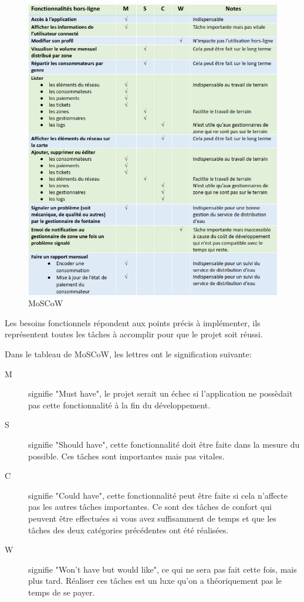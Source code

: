 \documentclass{EPL-master-thesis-covers-FR}
\begin{document}
			\begin{figure}[H]
				\centering
				\includegraphics[width=1\textwidth]{images/moscow}
				\caption{MoSCoW}
			\end{figure}
			
			Les besoins fonctionnels répondent aux points précis à implémenter, ils représentent toutes les tâches à accomplir pour que le projet soit réussi.

			Dans le tableau de MoSCoW, les lettres ont le signification suivante: 
			\begin{description}
				\item[M] signifie "Must have", le projet serait un échec si l'application ne possèdait pas cette fonctionnalité à la fin du développement.
				\item[S] signifie "Should have", cette fonctionnalité doit être faite dans la mesure du possible. Ces tâches sont importantes mais pas vitales.
				\item[C] signifie "Could have", cette fonctionnalité peut être faite si cela n'affecte pas les autres tâches importantes. Ce sont des tâches de confort qui peuvent être effectuées si vous avez suffisamment de temps et que les tâches des deux catégories précédentes ont été réalisées.
				\item[W] signifie "Won't have but would like", ce qui ne sera pas fait cette fois, mais plus tard. Réaliser ces tâches est un luxe qu'on a théoriquement pas le temps de se payer.
			\end{description}
			
\end{document}
